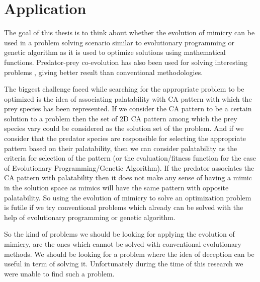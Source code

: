 \chapter{Application}

The goal of this thesis is to think about whether the evolution of mimicry can be used in a problem solving scenario similar to evolutionary programming or genetic algorithm as it is used to optimize solutions using mathematical functions. Predator-prey co-evolution has also been used for solving interesting problems \cite{hillis1990}, giving better result than conventional methodologies. 

The biggest challenge faced while searching for the appropriate problem to be optimized is the idea of associating palatability with CA pattern with which the prey species has been represented. If we consider the CA pattern to be a certain solution to a problem then the set of 2D CA pattern among which the prey species vary could be considered as the solution set of the problem. And if we consider that the predator species are responsible for selecting the appropriate pattern based on their palatability, then we can consider palatability as the criteria for selection of the pattern (or the evaluation/fitness function for the case of Evolutionary Programming/Genetic Algorithm). If the predator associates the CA pattern with palatability then it does not make any sense of having a mimic in the solution space as mimics will have the same pattern with opposite palatability. So using the evolution of mimicry to solve an optimization problem is futile if we try conventional problems which already can be solved with the help of evolutionary programming or genetic algorithm. 

So the kind of problems we should be looking for applying the evolution of mimicry, are the ones which cannot be solved with conventional evolutionary methods. We should be looking for a problem where the idea of deception can be useful in term of solving it. Unfortunately during the time of this research we were unable to find such a problem. 

